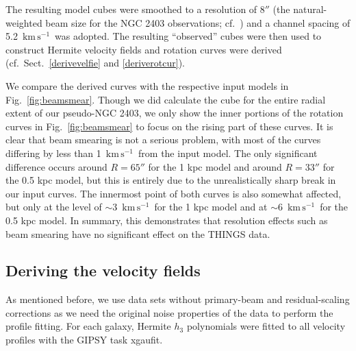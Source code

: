 \documentclass[usenatbib,usegraphicx,apjfonts,floatfix]{emulateapj}
\newcommand{\kms}{\ensuremath{\,\mbox{km}\,\mbox{s}^{-1}}}
\begin{document}
The resulting model cubes were smoothed to a resolution of $8''$ (the
natural-weighted beam size for the NGC 2403 observations;
cf.~\citealt{THINGS1}) and a channel spacing of 5.2 \kms\ was adopted.
The resulting ``observed'' cubes were then used to construct Hermite
velocity fields and rotation curves were derived
(cf.~Sect.~\ref{derivevelfie} and \ref{deriverotcur}).


We compare the derived curves with the respective input models in
Fig.~\ref{fig:beamsmear}. Though we did calculate the cube for the
entire radial extent of our pseudo-NGC 2403, we only show the inner
portions of the rotation curves in Fig.~\ref{fig:beamsmear} to focus
on the rising part of these curves. It is clear that beam smearing is
not a serious problem, with most of the curves differing by less than
1 \kms\ from the input model. The only significant difference occurs
around $R = 65''$ for the 1 kpc model and around $R=33''$ for the 0.5
kpc model, but this is entirely due to the unrealistically sharp break
in our input curves.  The innermost point of both curves is also
somewhat affected, but only at the level of $\sim 3$ \kms\ for the 1
kpc model and at $\sim 6$ \kms\ for the 0.5 kpc model.  In summary,
this demonstrates that resolution effects such as beam smearing have
no significant effect on the THINGS data.


\subsection{Deriving the velocity fields\label{derivevelfie}}

As mentioned before, we use data sets without primary-beam and
residual-scaling corrections as we need the original noise properties
of the data to perform the profile fitting.  For each galaxy, Hermite
$h_3$ polynomials were fitted to all velocity profiles with the GIPSY
task {\sc xgaufit}.
\end{document}
